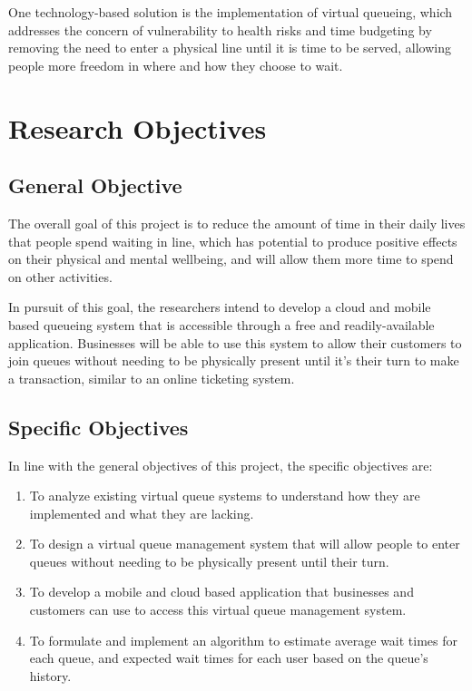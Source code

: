 One technology-based solution is the implementation of virtual queueing, which addresses the concern of vulnerability to health risks and time budgeting by removing the need to enter a physical line until it is time to be served, allowing people more freedom in where and how they choose to wait.


\section{Research Objectives}
\label{sec:researchobjectives}


\subsection{General Objective}
\label{sec:generalobjective}

The overall goal of this project is to reduce the amount of time in their daily lives that people spend waiting in line, which has potential to produce positive effects on their physical and mental wellbeing, and will allow them more time to spend on other activities.

In pursuit of this goal, the researchers intend to develop a cloud and mobile based queueing system that is accessible through a free and readily-available application. Businesses will be able to use this system to allow their customers to join queues without needing to be physically present until it’s their turn to make a transaction, similar to an online ticketing system.


\subsection{Specific Objectives}
\label{sec:specificobjectives}

In line with the general objectives of this project, the specific objectives are:

\begin{enumerate}
	\item To analyze existing virtual queue systems to understand how they are implemented and what they are lacking.
	\item To design a virtual queue management system that will allow people to enter queues without needing to be physically present until their turn.
	\item To develop a mobile and cloud based application that businesses and customers can use to access this virtual queue management system.
	\item To formulate and implement an algorithm to estimate average wait times for each queue, and expected wait times for each user based on the queue's history.
\end{enumerate}

